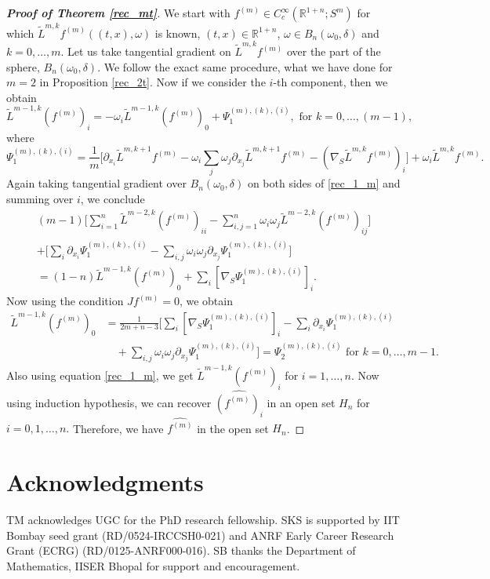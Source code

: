 \documentclass[11pt,a4paper,reqno]{amsart}
\newcommand{\R}{\mathbb{R}}
\newcommand{\Bdl}{B_{n}(\omega_0,\delta)}
\newcommand{\om}{\omega}
\begin{document}
\begin{proof}[\textbf{Proof of Theorem \ref{rec_mt}}]
		We start with $f^{(m)}\in C_{c}^{\infty}(\R^{1+n};S^m)$ for which $\tilde{L}^{m,k}f^{(m)}((t,x),\om)$ is known, $(t,x)\in \R^{1+n}$, $\om \in \Bdl$ and $k=0,\dots ,m.$ Let us take tangential gradient on $\tilde{L}^{m,k}f^{(m)}$ over the part of the sphere, $\Bdl$. We follow the exact same procedure, what we have done for $m=2$ in Proposition \ref{rec_2t}. Now if we consider the $i$-th component, then we obtain 
		\begin{equation}\label{rec_1_m}
			\tilde{L}^{m-1,k}(f^{(m)})_i=-\om_i\tilde{L}^{m-1,k}(f^{(m)})_0+\Psi_1^{(m),(k),(i)}, \text{  for } k=0,\dots,(m-1),
		\end{equation}
		where 
		\[
		\Psi_1^{(m),(k),(i)}=\frac{1}{m}\Big[\partial_{x_i}\tilde{L}^{m,k+1}f^{(m)}-\omega_{i}\sum_{j}\omega_{j}\partial_{x_j}\tilde{L}^{m,k+1}f^{(m)}-(\nabla_{S}\tilde{L}^{m,k}f^{(m)})_{i}\Big]+\omega_i \tilde{L}^{m,k}f^{(m)}.
		\]
		Again taking tangential gradient over $\Bdl$ on both sides of \eqref{rec_1_m} and summing over $i$, we conclude
		\[
		\begin{aligned}
			(m-1)\Big[\sum_{i=1}^{n}\tilde{L}^{m-2,k}(f^{(m)})_{ii}-\sum_{i,j=1}^{n}\om_i \om_j\tilde{L}^{m-2,k}(f^{(m)})_{ij}\Big] \\+\Big[\sum_{i}\partial_{x_i}\Psi_{1}^{(m),(k),(i)}-\sum_{i,j}\om_i\om_j\partial_{x_j}\Psi_{1}^{(m),(k),(i)}\Big] \\
			=(1-n)\tilde{L}^{m-1,k}(f^{(m)})_0+\sum_{i}[\nabla_{S}\Psi_{1}^{(m),(k),(i)}]_{i}.
		\end{aligned}
		\]
		Now using the condition  $Jf^{(m)}=0$, we obtain
		\[
		\begin{aligned}
			\tilde{L}^{m-1,k}(f^{(m)})_0 &=\frac{1}{2m+n-3}\Big[\sum_{i}[\nabla_{S}\Psi_{1}^{(m),(k),(i)}]_i-\sum_{i}\partial_{x_i}\Psi_{1}^{(m),(k),(i)} \\&\quad+\sum_{i,j}\om_i \om_j\partial_{x_j}\Psi_{1}^{(m),(k),(i)}\Big]=\Psi_2^{(m),(k),(i)}\text{ for } k=0,\dots,m-1.
		\end{aligned}
		\]
		Also using equation \eqref{rec_1_m}, we get $\tilde{L}^{m-1,k}(f^{(m)})_i$ for $i=1,\dots,n$. Now using induction hypothesis, we can recover $\widehat{(f^{(m)})_{i}}$ in an open set $H_n$ for $i=0,1,\dots,n.$ Therefore, we have $\widehat{f^{(m)}}$ in the open set $H_n$.
	\end{proof}
	\section*{Acknowledgments}
	    TM acknowledges UGC for the PhD research fellowship. SKS is supported by IIT Bombay seed grant (RD/0524-IRCCSH0-021) and ANRF Early Career Research  Grant (ECRG) (RD/0125-ANRF000-016). SB thanks the Department of Mathematics, IISER Bhopal for support and encouragement.
\end{document}
